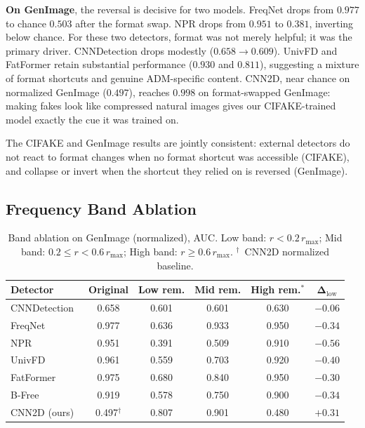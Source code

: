 \documentclass{article}
\begin{document}
\noindent\textbf{On GenImage}, the reversal is decisive for two models.
FreqNet drops from $0.977$ to chance $0.503$ after the format swap.
NPR drops from $0.951$ to $0.381$, inverting below chance.
For these two detectors, format was not merely helpful; it was the primary driver.
CNNDetection drops modestly ($0.658\to0.609$).
UnivFD and FatFormer retain substantial performance ($0.930$ and $0.811$), suggesting a mixture of format shortcuts and genuine ADM-specific content.
CNN2D, near chance on normalized GenImage ($0.497$), reaches $0.998$ on format-swapped GenImage: making fakes look like compressed natural images gives our CIFAKE-trained model exactly the cue it was trained on.

The CIFAKE and GenImage results are jointly consistent: external detectors do not react to format changes when no format shortcut was accessible (CIFAKE), and collapse or invert when the shortcut they relied on is reversed (GenImage).

\subsection{Frequency Band Ablation}

\begin{table}[t]
\centering
\small
\setlength{\tabcolsep}{4pt}
\begin{tabular}{lccccc}
\toprule
\textbf{Detector} & \textbf{Original} & \textbf{Low rem.} & \textbf{Mid rem.} & \textbf{High rem.$^\ast$} & $\boldsymbol{\Delta}_\text{low}$ \\
\midrule
CNNDetection~\cite{wang2020cnn} & 0.658 & 0.601 & 0.601 & 0.630 & $-0.06$ \\
FreqNet~\cite{freqnet}          & 0.977 & 0.636 & 0.933 & 0.950 & $-0.34$ \\
NPR~\cite{npr}                  & 0.951 & 0.391 & 0.509 & 0.910 & $-0.56$ \\
UnivFD~\cite{univfd}            & 0.961 & 0.559 & 0.703 & 0.920 & $-0.40$ \\
FatFormer~\cite{fatformer}      & 0.975 & 0.680 & 0.840 & 0.950 & $-0.30$ \\
B-Free~\cite{bfree}             & 0.919 & 0.578 & 0.750 & 0.900 & $-0.34$ \\
CNN2D (ours)                    & 0.497$^\dag$ & 0.807 & 0.901 & 0.480 & $+0.31$ \\
\bottomrule
\end{tabular}
\caption{Band ablation on GenImage (normalized), AUC. Low band: $r < 0.2\,r_{\max}$; Mid band: $0.2\leq r < 0.6\,r_{\max}$; High band: $r \geq 0.6\,r_{\max}$. $^\dag$~CNN2D normalized baseline.}
\label{tab:ablation}
\end{table}
\end{document}
